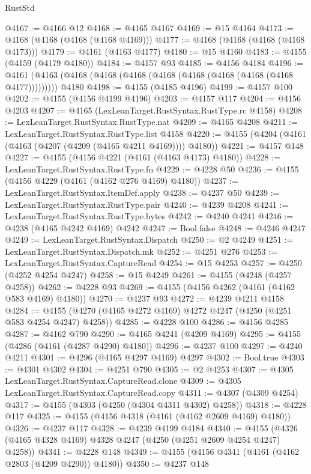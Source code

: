 \begin{lexlean}{RustStd}
\begin{coremodule}
@4167 := @4166 @12
@4168 := @4165 @4167
@4169 := @15 @4164
@4173 := @4168 (@4168 (@4168 (@4168 @4169)))
@4177 := @4168 (@4168 (@4168 (@4168 @4173)))
@4179 := @4161 (@4163 @4177)
@4180 := @15 @4160
@4183 := @4155 (@4159 (@4179 @4180))
@4184 := @4157 @93
@4185 := @4156 @4184
@4196 := @4161 (@4163 (@4168 (@4168 (@4168 (@4168 (@4168 (@4168 (@4168 (@4168 @4177))))))))) @4180
@4198 := @4155 (@4185 @4196)
@4199 := @4157 @100
@4202 := @4155 (@4156 @4199 @4196)
@4203 := @4157 @117
@4204 := @4156 @4203
@4207 := @4165 (LexLeanTarget.RustSyntax.RustType.rc @4158)
@4208 := LexLeanTarget.RustSyntax.RustType.nat
@4209 := @4165 @4208
@4211 := LexLeanTarget.RustSyntax.RustType.list @4158
@4220 := @4155 (@4204 (@4161 (@4163 (@4207 (@4209 (@4165 @4211 @4169)))) @4180))
@4221 := @4157 @148
@4227 := @4155 (@4156 @4221 (@4161 (@4163 @4173) @4180))
@4228 := LexLeanTarget.RustSyntax.RustType.fn
@4229 := @4228 @50
@4236 := @4155 (@4156 @4229 (@4161 (@4162 @276 @4169) @4180))
@4237 := LexLeanTarget.RustSyntax.ItemDef.apply
@4238 := @4237 @50
@4239 := LexLeanTarget.RustSyntax.RustType.pair
@4240 := @4239 @4208
@4241 := LexLeanTarget.RustSyntax.RustType.bytes
@4242 := @4240 @4241
@4246 := @4238 (@4165 @4242 @4169) @4242
@4247 := Bool.false
@4248 := @4246 @4247
@4249 := LexLeanTarget.RustSyntax.Dispatch
@4250 := @2 @4249
@4251 := LexLeanTarget.RustSyntax.Dispatch.mk
@4252 := @4251 @276
@4253 := LexLeanTarget.RustSyntax.CaptureRead
@4254 := @15 @4253
@4257 := @4250 (@4252 @4254 @4247)
@4258 := @15 @4249
@4261 := @4155 (@4248 (@4257 @4258))
@4262 := @4228 @93
@4269 := @4155 (@4156 @4262 (@4161 (@4162 @583 @4169) @4180))
@4270 := @4237 @93
@4272 := @4239 @4211 @4158
@4284 := @4155 (@4270 (@4165 @4272 @4169) @4272 @4247 (@4250 (@4251 @583 @4254 @4247) @4258))
@4285 := @4228 @100
@4286 := @4156 @4285
@4287 := @4162 @790
@4290 := @4165 @4241 (@4209 @4169)
@4295 := @4155 (@4286 (@4161 (@4287 @4290) @4180))
@4296 := @4237 @100
@4297 := @4240 @4211
@4301 := @4296 (@4165 @4297 @4169) @4297
@4302 := Bool.true
@4303 := @4301 @4302
@4304 := @4251 @790
@4305 := @2 @4253
@4307 := @4305 LexLeanTarget.RustSyntax.CaptureRead.clone
@4309 := @4305 LexLeanTarget.RustSyntax.CaptureRead.copy
@4311 := @4307 (@4309 @4254)
@4317 := @4155 (@4303 (@4250 (@4304 @4311 @4302) @4258))
@4318 := @4228 @117
@4325 := @4155 (@4156 @4318 (@4161 (@4162 @2609 @4169) @4180))
@4326 := @4237 @117
@4328 := @4239 @4199 @4184
@4340 := @4155 (@4326 (@4165 @4328 @4169) @4328 @4247 (@4250 (@4251 @2609 @4254 @4247) @4258))
@4341 := @4228 @148
@4349 := @4155 (@4156 @4341 (@4161 (@4162 @2803 (@4209 @4290)) @4180))
@4350 := @4237 @148

\end{coremodule}
\end{lexlean}

